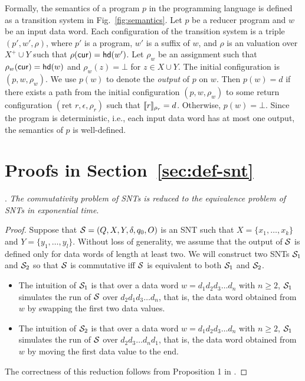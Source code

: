 \begin{appendix}
Formally, the semantics of a program $p$ in the programming language is defined as a transition system in Fig.~\ref{fig:semantics}. Let $p$ be a reducer program and $w$ be an input data word.  Each configuration of the transition system is a triple $(p', w', \rho)$, where $p'$ is a program, $w'$ is a suffix of $w$, and $\rho$ is an valuation over $X^+\cup Y$ such that $\rho(\mathsf{cur})=\mathsf{hd}(w')$. 
Let $\rho_w$ be an assignment such that $\rho_w(\mathsf{cur})=\mathsf{hd}(w)$ and $\rho_w(z)=\bot$ for $z \in X \cup Y$.
The initial configuration is $(p, w, \rho_w)$.
We use $p(w)$ to denote the \emph{output} of $p$ on $w$. Then $p(w) =d$ if there exists a path from the initial configuration $(p, w, \rho_w)$ to some return configuration $(\mbox{ret }r,  \epsilon, \rho_r)$ such that $
\llbracket r\rrbracket_{\rho_r}=d$. Otherwise, $p(w)=\bot$. Since the program is deterministic, i.e., each input data word has at most one output, the semantics of $p$ is well-defined.

\section{Proofs in Section~\ref{sec:def-snt}}

. 
\emph{The commutativity problem of SNTs is reduced to the equivalence problem of SNTs in exponential time}.

\begin{proof}
Suppose that ${\mathcal{S} }=(Q, X, Y, \delta, q_0, O)$ is an SNT such that $X=\{x_1,\dots,x_k\}$ and $Y=\{y_1,\dots,y_l\}$. Without loss of generality, we assume that the output of ${\mathcal{S} }$ is defined only for data words of length at least two. We will construct two SNTs ${\mathcal{S} }_1$ and ${\mathcal{S} }_2$ so that ${\mathcal{S} }$ is commutative iff ${\mathcal{S} }$ is equivalent to both ${\mathcal{S} }_1$ and ${\mathcal{S} }_2$.
\begin{itemize}
\item The intuition of ${\mathcal{S} }_1$ is that over a data word $w=d_1 d_2 d_3 \dots d_n$ with $n\ge 2$, ${\mathcal{S} }_1$ simulates the run of ${\mathcal{S} }$ over $d_2 d_1 d_3 \dots d_n$, that is, the data word obtained from $w$ by swapping the first two data values.
%
\item The intuition of ${\mathcal{S} }_2$ is that over a data word $w=d_1 d_2 d_3 \dots d_n$ with $n\ge 2$, ${\mathcal{S} }_1$ simulates the run of ${\mathcal{S} }$ over $d_2 d_3 \dots d_n d_1$, that is, the data word obtained from $w$ by moving the first data value to the end. 
\end{itemize}
The correctness of this reduction follows from Proposition 1 in \cite{CHSW15}.


\end{proof}
\end{appendix}
